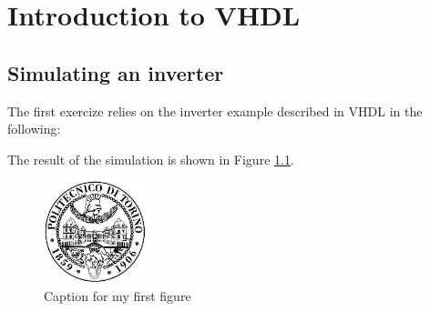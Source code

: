 

\chapter{Introduction to VHDL}




\section{Simulating an inverter}

The first exercize relies on the inverter example described in VHDL 
in the following:
	\begin{listato}
	
	\end{listato}


The result of the simulation is shown in Figure \ref{fig:cap1:iv}.


	\begin{figure}[h]
	\centering
	\includegraphics[width=3cm]{./logopoli}
	\caption{Caption for my first figure}
	\label{fig:cap1:iv}
	\end{figure}

